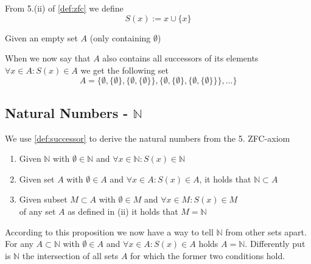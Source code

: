 \begin{definition}[Successor]\label{def:successor}
   From 5.(ii) of \cref{def:zfc} we define
   \[S(x) := x \cup \{x\}\]
\end{definition}
\begin{example}
   Given an empty set \(A\) (only containing \(\emptyset\))

   When we now say that \(A\) also contains all successors of its elements \(\forall x \in A: S(x) \in A\) we get the following set
   \[A = \{\emptyset, \{\emptyset\}, \{\emptyset, \{\emptyset\}\}, \{\emptyset, \{\emptyset\}, \{\emptyset, \{\emptyset\}\}\}, \ldots\}\]
\end{example}

\subsection{Natural Numbers - \texorpdfstring{\(\mathbb{N}\)}{N}}
\begin{proposition}\label{pro:n}
   We use \cref{def:successor} to derive the natural numbers from the 5. ZFC-axiom
   \begin{enumerate}[label=\roman*, align=Center]
      \item Given \(\mathbb{N}\) with \(\emptyset \in \mathbb{N}\) and \(\forall x \in \mathbb{N}: S(x) \in \mathbb{N}\)
      \item Given set \(A\) with \(\emptyset \in A\) and \(\forall x \in A: S(x) \in A\), it holds that \(\mathbb{N} \subset A\)
      \item Given subset \(M \subset A\) with \(\emptyset \in M\) and \(\forall x \in M: S(x) \in M\)\\
         of any set \(A\) as defined in (ii) it holds that \(M = \mathbb{N}\)
   \end{enumerate}
\end{proposition}
\begin{remark}
   According to this proposition we now have a way to tell \(\mathbb{N}\) from other sets apart.
   For any \(A \subset \mathbb{N}\) with \(\emptyset \in A\) and \(\forall x \in A: S(x) \in A\) holds \(A = \mathbb{N}\).
   Differently put is \(\mathbb{N}\) the intersection of all sets \(A\) for which the former two conditions hold.
\end{remark}

